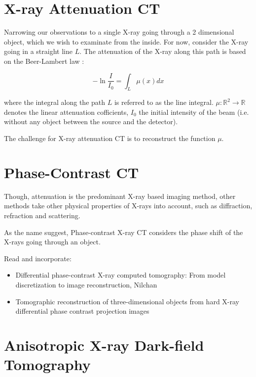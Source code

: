 
\section{X-ray Attenuation CT}\label{sec:xray_attenuation_ct}


Narrowing our observations to a single X-ray going through a 2 dimensional object, which we wish to
examinate from the inside. For now, consider the X-ray going in a straight line \(L\). The
attenuation of the X-ray along this path is based on the Beer-Lambert law \cite{buzug_computed_2008}:

\begin{equation}
	\label{eq:beer-Lambert-law}
	- \ln \frac{I}{I_0} = \int_L \mu (x) dx
\end{equation}

where the integral along the path \(L\) is referred to as the line integral.
\(\mu \colon \mathbb{R}^2 \to \mathbb{R}\) denotes the linear attenuation cofficients, \(I_0\)
the initial intensity of the beam (i.e. without any object between the source and the detector).

The challenge for X-ray attenuation CT is to reconstruct the function \(\mu\).

\section{Phase-Contrast CT}\label{sec:phasecontrast_ct}

Though, attenuation is the predominant X-ray based imaging method, other methods take other physical
properties of X-rays into account, such as diffraction, refraction and scattering.

As the name suggest, Phase-contrast X-ray CT considers the phase shift of the X-rays going through
an object.

Read and incorporate:
\begin{itemize}
	\item Differential phase-contrast X-ray computed tomography: From model discretization to image
	      reconstruction, Nilchan
	\item Tomographic reconstruction of three-dimensional objects from hard X-ray differential phase
	      contrast projection images
\end{itemize}


\section{Anisotropic X-ray Dark-field Tomography}\label{sec:axdt}

